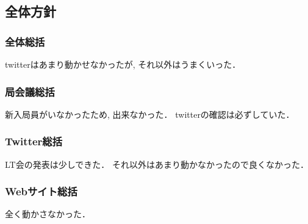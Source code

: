 \subsection*{全体方針}


\subsubsection*{全体総括}

twitterはあまり動かせなかったが, それ以外はうまくいった．

\subsubsection*{局会議総括}

新入局員がいなかったため, 出来なかった．
twitterの確認は必ずしていた．

\subsubsection*{Twitter総括}

LT会の発表は少しできた．
それ以外はあまり動かなかったので良くなかった．

\subsubsection*{Webサイト総括}

全く動かさなかった．